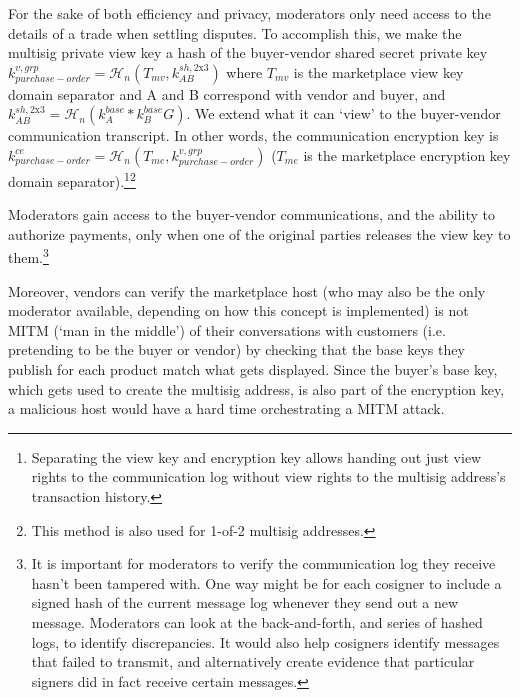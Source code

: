 For the sake of both efficiency and privacy, moderators only need access to the details of a trade when settling disputes. To accomplish this, we make the multisig private view key a hash of the buyer-vendor shared secret private key $k^{v,grp}_{purchase-order} = \mathcal{H}_n(T_{mv},k^{sh,\textrm{2x3}}_{AB})$ where $T_{mv}$ is the marketplace view key domain separator and A and B correspond with vendor and buyer, and $k^{sh,\textrm{2x3}}_{AB} = \mathcal{H}_n(k^{base}_{A}*k^{base}_{B} G)$. We extend what it can `view' to the buyer-vendor communication transcript. In other words, the communication encryption key is $k^{ce}_{purchase-order} = \mathcal{H}_n(T_{me},k^{v,grp}_{purchase-order})$ ($T_{me}$ is the marketplace encryption key domain separator).\footnote{Separating the view key and encryption key allows handing out just view rights to the communication log without view rights to the multisig address's transaction history.}\footnote{This method is also used for 1-of-2 multisig addresses.}

Moderators gain access to the buyer-vendor communications, and the ability to authorize payments, only when one of the original parties releases the view key to them.\footnote{It is important for moderators to verify the communication log they receive hasn't been tampered with. One way might be for each cosigner to include a signed hash of the current message log whenever they send out a new message. Moderators can look at the back-and-forth, and series of hashed logs, to identify discrepancies. It would also help cosigners identify messages that failed to transmit, and alternatively create evidence that particular signers did in fact receive certain messages.}

Moreover, vendors can verify the marketplace host (who may also be the only moderator available, depending on how this concept is implemented) is not MITM (`man in the middle') of their conversations with customers (i.e. pretending to be the buyer or vendor) by checking that the base keys they publish for each product match what gets displayed. Since the buyer's base key, which gets used to create the multisig address, is also part of the encryption key, a malicious host would have a hard time orchestrating a MITM attack.
